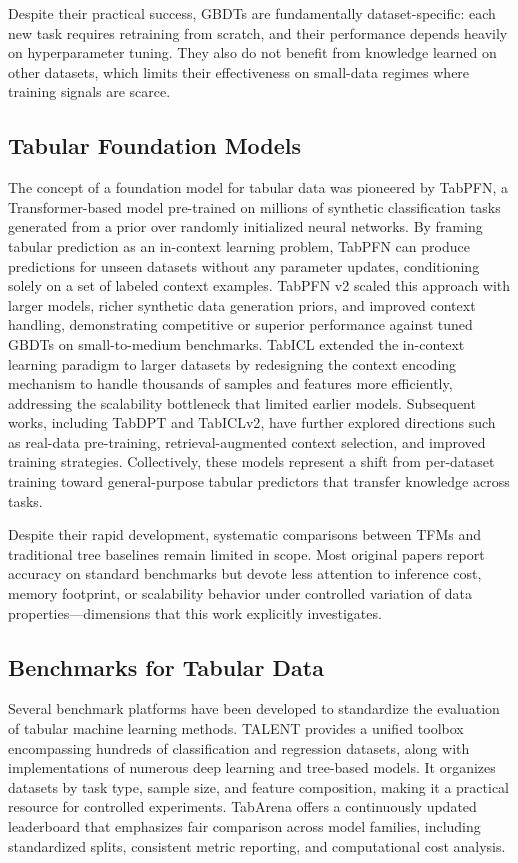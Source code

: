 \documentclass{SYSUReport}
\begin{document}
Despite their practical success, GBDTs are fundamentally dataset-specific: each new task requires retraining from scratch, and their performance depends heavily on hyperparameter tuning. They also do not benefit from knowledge learned on other datasets, which limits their effectiveness on small-data regimes where training signals are scarce.


\subsection{Tabular Foundation Models}
The concept of a foundation model for tabular data was pioneered by TabPFN, a Transformer-based model pre-trained on millions of synthetic classification tasks generated from a prior over randomly initialized neural networks. By framing tabular prediction as an in-context learning problem, TabPFN can produce predictions for unseen datasets without any parameter updates, conditioning solely on a set of labeled context examples. TabPFN v2 scaled this approach with larger models, richer synthetic data generation priors, and improved context handling, demonstrating competitive or superior performance against tuned GBDTs on small-to-medium benchmarks. TabICL extended the in-context learning paradigm to larger datasets by redesigning the context encoding mechanism to handle thousands of samples and features more efficiently, addressing the scalability bottleneck that limited earlier models. Subsequent works, including TabDPT\cite{ma2025tabdpt} and TabICLv2\cite{qu2026tabiclv2}, have further explored directions such as real-data pre-training, retrieval-augmented context selection, and improved training strategies. Collectively, these models represent a shift from per-dataset training toward general-purpose tabular predictors that transfer knowledge across tasks.

Despite their rapid development, systematic comparisons between TFMs and traditional tree baselines remain limited in scope. Most original papers report accuracy on standard benchmarks but devote less attention to inference cost, memory footprint, or scalability behavior under controlled variation of data properties—dimensions that this work explicitly investigates.



\subsection{Benchmarks for Tabular Data}
Several benchmark platforms have been developed to standardize the evaluation of tabular machine learning methods. TALENT provides a unified toolbox encompassing hundreds of classification and regression datasets, along with implementations of numerous deep learning and tree-based models. It organizes datasets by task type, sample size, and feature composition, making it a practical resource for controlled experiments. TabArena \cite{erickson2026tabarena} offers a continuously updated leaderboard that emphasizes fair comparison across model families, including standardized splits, consistent metric reporting, and computational cost analysis.
\end{document}
